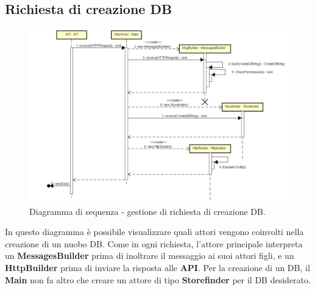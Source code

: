 \documentclass[a4paper]{article}
\begin{document}
        \subsection{Richiesta di creazione DB}
            \begin{figure} [H]
				\centering
				\includegraphics[width=\textwidth]{ST/seq/GestioneDB.png}
				\caption{Diagramma di sequenza - gestione di richiesta di creazione DB.}
			\end{figure}
            In questo diagramma è possibile visualizzare quali attori vengono coinvolti nella creazione di un nuobo DB. Come in ogni richiesta, l'attore principale interpreta un \textbf{MessagesBuilder} 
            prima di inoltrare il messaggio ai suoi attori figli, e un \textbf{HttpBuilder} prima di inviare la risposta alle \textbf{API}. Per la creazione di un DB, il \textbf{Main} non fa altro che 
            creare un attore di tipo \textbf{Storefinder} per il DB desiderato.
            
\end{document}
